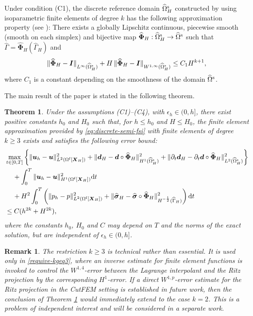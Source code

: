 \documentclass[11pt,reqno]{amsart}
\theoremstyle{definition}
\theoremstyle{plain}
\newtheorem{theorem}{Theorem}[section]
\newtheorem{remark}{Remark}[section]
\numberwithin{theorem}{section}
\numberwithin{proposition}{section}
\numberwithin{lemma}{section}
\numberwithin{equation}{section}
\newcommand{\bs}[1]{\boldsymbol{#1}}
\newcommand{\dep}{{{\bs{d}}}}
\def\d{\mathrm{d}}
\renewcommand{\(}{\bigl(}
\renewcommand{\)}{\bigr)}
\begin{document}
Under condition (C1), the discrete reference domain $\widehat{\Omega}^{\rm s}_H$ constructed by using isoparametric finite elements of degree $k$ has the following approximation property (see \cite{Lenoir-1986}): There exists a globally Lipschitz continuous, piecewise smooth (smooth on each simplex) and bijective map 
$
\widehat{\bs\Phi}_H : \widehat{\Omega}^{\rm s}_H \rightarrow  \widehat{\Omega}^{\rm s}
$
such that $\widehat\Gamma = \widehat{\bs\Phi}_H(\widehat\Gamma_{ H})$ and
\begin{equation}\label{GeomApprox}
\|\widehat{\bs\Phi}_H - {\bs I} \|_{L^{\infty}(\widehat{\Omega}^{\rm s}_H)} +
H\,\| \widehat{\bs\Phi}_H - {\bs I} \|_{W^{1,\infty}(\widehat{\Omega}^{\rm s}_H)}\le C_1 H^{k+1} ,
\end{equation} 
where $C_1$ is a constant depending on the smoothness of the domain $\widehat{\Omega}^{\rm s}$. 

 The main result of the paper is stated in the following theorem.

\begin{theorem}\label{THM}
Under the assumptions (C1)--(C4), with $\epsilon_h\in(0,h]$, there exist positive constants $h_0$ and $H_0$ such that, for $h\le h_0$ and $H\le H_0$, the finite element approximation provided by \eqref{eq:discrete-semi-fsi} with finite elements of degree $k\ge 3$ exists and satisfies the following error bound{\rm:}
\begin{align}\label{Est:main}
&\max_{t\in[0,T]} \left\{ \| {\bs u}_h - {\bs u} \|_{L^2(\Omega^{\rm f}[\bs X_H])}^2 
+ \| {\bs d}_H - {\bs d}\circ\widehat{\bs\Phi}_H \|_{H^1(\widehat{\Omega}^{\rm s}_H)}^2 
+ \| \partial_t\dep_H - \partial_t\dep\circ\widehat{\bs\Phi}_H \|_{L^2(\widehat{\Omega}^{\rm s}_H)}^2 \right\}  \notag\\
&\quad\, 
+ \int_0^{T} \| {\bs u}_h - {\bs u} \|_{H^1(\Omega^{\rm f}[\bs X_H])}^2 \d t \notag\\
&\quad\, 
+ H^2 \int_0^{T} \left( \| p_h - p \|_{L^2(\Omega^{\rm f}[\bs X_H])}^2 
+ \| \widehat{\bs\sigma}_H - \widehat{\bs\sigma}\circ\widehat{\bs\Phi}_H \|_{H^{-\frac12}(\widehat\Gamma_H)}^2 \right) \d t 
\notag\\
&\le C(h^{2k}+H^{2k}) ,  
\end{align}
where the constants $h_0$, $H_0$ and $C$ may depend on $T$ and the norms of the exact solution, but are independent of $\epsilon_h\in(0,h]$. 
\end{theorem}

\begin{remark}\label{remark0_THM}\upshape 
The restriction $k\ge 3$ is technical rather than essential. It is used only in \eqref{requive-kgeq3}, where an inverse estimate for finite element functions is invoked to control the $W^{1,4}$-error between the Lagrange interpolant and the Ritz projection by the corresponding $H^1$-error. If a direct $W^{1,p}$-error estimate for the Ritz projection in the CutFEM setting is established in future work, then the conclusion of Theorem \ref{THM} would immediately extend to the case $k=2$. This is a problem of independent interest and will be considered in a separate work. 
\end{remark}
\end{document}
